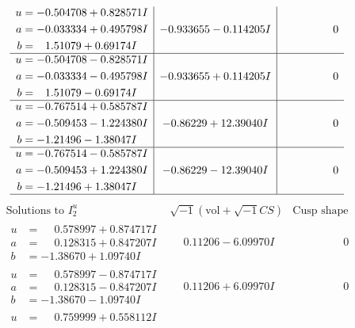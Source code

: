 \documentclass[1p]{elsarticle_modified}
\theoremstyle{definition}
\newcommand{\I}{\sqrt{-1}}
\begin{document}
$$\begin{array}{c|c|c}
\begin{aligned}
u &= -0.504708 + 0.828571 I \\
a &= -0.033334 + 0.495798 I \\
b &= \phantom{-}1.51079 + 0.69174 I\end{aligned}
 & -0.933655 - 0.114205 I & \phantom{-0.000000 } 0 \\ \hline\begin{aligned}
u &= -0.504708 - 0.828571 I \\
a &= -0.033334 - 0.495798 I \\
b &= \phantom{-}1.51079 - 0.69174 I\end{aligned}
 & -0.933655 + 0.114205 I & \phantom{-0.000000 } 0 \\ \hline\begin{aligned}
u &= -0.767514 + 0.585787 I \\
a &= -0.509453 - 1.224380 I \\
b &= -1.21496 - 1.38047 I\end{aligned}
 & -0.86229 + 12.39040 I & \phantom{-0.000000 } 0 \\ \hline\begin{aligned}
u &= -0.767514 - 0.585787 I \\
a &= -0.509453 + 1.224380 I \\
b &= -1.21496 + 1.38047 I\end{aligned}
 & -0.86229 - 12.39040 I & \phantom{-0.000000 } 0\\
 \hline 
 \end{array}$$\newpage$$\begin{array}{c|c|c}  
\text{Solutions to }I^u_{2}& \I (\text{vol} + \sqrt{-1}CS) & \text{Cusp shape}\\
 \hline 
\begin{aligned}
u &= \phantom{-}0.578997 + 0.874717 I \\
a &= \phantom{-}0.128315 + 0.847207 I \\
b &= -1.38670 + 1.09740 I\end{aligned}
 & \phantom{-}0.11206 - 6.09970 I & \phantom{-0.000000 } 0 \\ \hline\begin{aligned}
u &= \phantom{-}0.578997 - 0.874717 I \\
a &= \phantom{-}0.128315 - 0.847207 I \\
b &= -1.38670 - 1.09740 I\end{aligned}
 & \phantom{-}0.11206 + 6.09970 I & \phantom{-0.000000 } 0 \\ \hline\begin{aligned}
u &= \phantom{-}0.759999 + 0.558112 I \\

\end{aligned}
\end{array}$$
\end{document}
